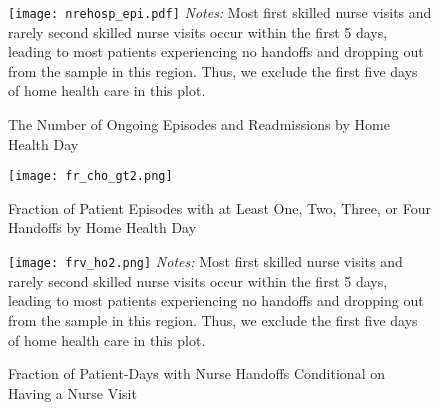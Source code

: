 \documentclass[final,12pt, notitlepage]{article}
\begin{document}
\begin{singlespace}

\graphicspath{ {/Users/kimk13/Dropbox/Wharton/Research/Labor/gph/anhandoff/} }
\newpage
\begin{figure}[H]
\begin{minipage}{\linewidth}
\centering
\texttt{[image: nrehosp\_epi.pdf]}
\footnotesize
\justify
\emph{Notes:}
Most first skilled nurse visits and rarely second skilled nurse visits occur within the first 5 days, leading to most patients experiencing no handoffs and dropping out from the sample in this region. Thus, we exclude the first five days of home health care in this plot.
\end{minipage}
\caption{The Number of Ongoing Episodes and Readmissions by Home Health Day}
\label{fig:pct_rehosp}
\end{figure}

\graphicspath{ {/Users/kimk13/Dropbox/Wharton/Research/Labor/gph/anhandoff/} }
\begin{figure}[H]
\begin{minipage}{\linewidth}
\centering
\texttt{[image: fr\_cho\_gt2.png]}
\footnotesize
\justify
\end{minipage}
\caption{Fraction of Patient Episodes with at Least One, Two, Three, or Four Handoffs by Home Health Day}
\label{fig:fr_cho_gt}
\end{figure}

\graphicspath{ {/Users/kimk13/Dropbox/Wharton/Research/Labor/gph/anhandoff/} }
\begin{figure}[H]
\begin{minipage}{\linewidth}
\centering
\texttt{[image: frv\_ho2.png]}
\footnotesize
\justify
\emph{Notes:}
Most first skilled nurse visits and rarely second skilled nurse visits occur within the first 5 days, leading to most patients experiencing no handoffs and dropping out from the sample in this region. Thus, we exclude the first five days of home health care in this plot.
\end{minipage}
\caption{Fraction of Patient-Days with Nurse Handoffs Conditional on Having a Nurse Visit}
\label{fig:frv_ho}
\end{figure}




\end{singlespace}
\end{document}
